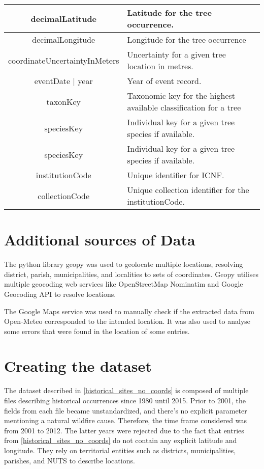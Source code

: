 \begin{table}[h!]
\begin{tabular}{|c|p{7.5cm}|}
decimalLatitude & Latitude for the tree occurrence. \\
\hline

decimalLongitude & Longitude for the tree occurrence \\
\hline

coordinateUncertaintyInMeters & Uncertainty for a given tree location in metres. \\
\hline

eventDate | year & Year of event record. \\
\hline

taxonKey & Taxonomic key for the highest available classification for a tree \\
\hline

speciesKey & Individual key for a given tree species if available. \\
\hline

speciesKey & Individual key for a given tree species if available. \\
\hline

institutionCode & Unique identifier for ICNF. \\
\hline

collectionCode & Unique collection identifier for the institutionCode. \\
\hline
\end{tabular}
\end{table}


\section{Additional sources of Data}
The python library geopy \cite{geopy} was used to geolocate multiple locations, resolving district, parish, municipalities, and localities to sets of coordinates. Geopy utilises multiple geocoding web services like OpenStreetMap Nominatim and Google Geocoding API to resolve locations. 


The Google Maps service \cite{googlexmaps} was used to manually check if the extracted data from Open-Meteo corresponded to the intended location. It was also used to analyse some errors that were found in the location of some entries.




\section{Creating the dataset}
The dataset described in \ref{historical_sites_no_coords} is composed of multiple files describing historical occurrences since 1980 until 2015. Prior to 2001, the fields from each file became unstandardized, and there's no explicit parameter mentioning a natural wildfire cause. Therefore, the time frame considered was from 2001 to 2012. The latter years were rejected due to the fact that entries from \ref{historical_sites_no_coords} do not contain any explicit latitude and longitude. They rely on territorial entities such as districts, municipalities, parishes, and NUTS to describe locations.

